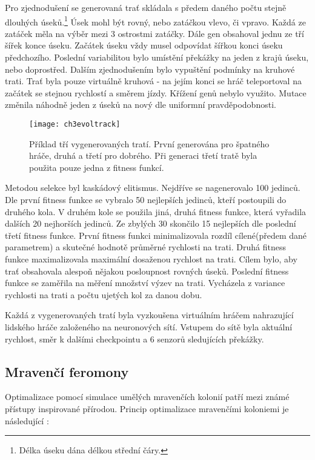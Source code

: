 Pro zjednodušení se generovaná trať skládala s předem daného počtu stejně dlouhých úseků.\footnote{Délka úseku dána délkou střední čáry.} Úsek mohl být rovný, nebo zatáčkou vlevo, či vpravo. Každá ze zatáček měla na výběr mezi 3 ostrostmi zatáčky. Dále gen obsahoval jednu ze tří šířek konce úseku. Začátek úseku vždy musel odpovídat šířkou konci úseku předchozího. Poslední variabilitou bylo umístění překážky na jeden z krajů úseku, nebo doprostřed. Dalším zjednodušením bylo vypuštění podmínky na kruhové trati. Trať byla pouze virtuálně kruhová - na jejím konci se hráč teleportoval na začátek se stejnou rychlostí a směrem jízdy. Křížení genů nebylo využito. Mutace změnila náhodně jeden z úseků na nový dle uniformní pravděpodobnosti.

\begin{figure}
  \centering
  \texttt{[image: ch3evoltrack]}
	\caption{Příklad tří vygenerovaných tratí. První generována pro špatného hráče, druhá a třetí pro dobrého. Při generaci třetí tratě byla použita pouze jedna z fitness funkcí. \cite{EvolTrack} }
	\label{fig-ch3evoltrack}
\end{figure}

Metodou selekce byl kaskádový elitismus. Nejdříve se nagenerovalo 100 jedinců. Dle první fitness funkce se vybralo 50 nejlepších jedinců, kteří postoupili do druhého kola. V druhém kole se použila jiná, druhá fitness funkce, která vyřadila dalších 20 nejhorších jedinců. Ze zbylých 30 skončilo 15 nejlepších dle poslední třetí fitness funkce. První fitness funkci minimalizovala rozdíl cílené(předem dané parametrem) a skutečné hodnotě průměrné rychlosti na trati. Druhá fitness funkce maximalizovala maximální dosaženou rychlost na trati. Cílem bylo, aby trať obsahovala alespoň nějakou posloupnost rovných úseků. Poslední fitness funkce se zaměřila na měření množství výzev na trati. Vycházela z variance rychlosti na trati a počtu ujetých kol za danou dobu. 

Každá z vygenerovaných tratí byla vyzkoušena virtuálním hráčem nahrazující lidského hráče založeného na neuronových sítí. Vstupem do sítě byla aktuální rychlost, směr k dalšími checkpointu a 6 senzorů sledujících překážky.

\subsection{Mravenčí feromony} \label{sec:ants}

Optimalizace pomocí simulace umělých mravenčích kolonií patří mezi známé přístupy inspirované přírodou. Princip optimalizace mravenčími koloniemi je následující :


